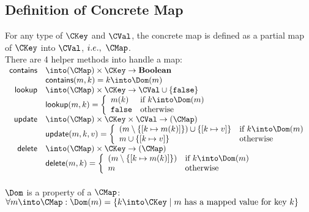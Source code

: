 \subsection{Definition of Concrete Map}
For any type of $\CKey$ and $\CVal$,
the concrete map is defined as a partial map of $\CKey$ into $\CVal$,
$i.e., ~ \CMap$.\\
There are 4 helper methods into handle a map:\\

$\begin{array}{rl}
\textsf{contains} & \into (\CMap) \times \CKey \rightarrow \textbf{Boolean} \\
& \textsf{contains}(m, k) = k \into \Dom(m) \\
\textsf{lookup} & \into (\CMap) \times \CKey \rightarrow \CVal \cup \{ \texttt{false} \}\\
& \textsf{lookup}(m, k) = \left \{ \begin{array}{ll}
m(k) & \textrm{if } k \into \Dom(m) \\
\texttt{false} & \textrm{otherwise} \\
\end{array} \right. \\
\textsf{update} & \into (\CMap) \times \CKey \times \CVal \rightarrow (\CMap) \\
& \textsf{update}(m, k, v) = \left \{ \begin{array}{ll}
(m \setminus \{ [k \mapsto m(k)] \}) \cup \{ [k \mapsto v] \} & \textrm{if } k \into \Dom(m) \\
m \cup \{ [k \mapsto v] \} & \textrm {otherwise} \\
\end{array} \right.\\
\textsf{delete} & \into (\CMap) \times \CKey \rightarrow (\CMap) \\
& \textsf{delete}(m, k) = \left \{ \begin{array}{ll}
(m \setminus \{ [k \mapsto m(k)] \}) & \textrm{if } k \into \Dom(m) \\
m & \textrm{otherwise} \\
\end{array} \right. \\
\end{array}$\\\\
$\Dom$ is a property of a $\CMap$:\\

$\forall m \into \CMap:
\Dom(m) = \{ k \into \CKey \mid
m \textrm{ has a mapped value for key } k \}$
